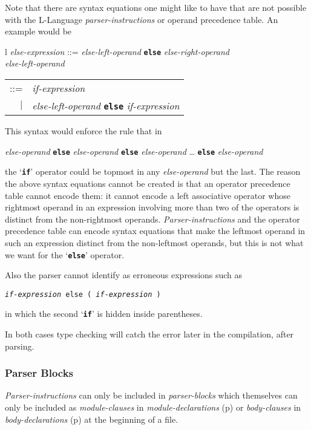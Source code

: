 \documentclass[12pt]{article}
\newcommand{\TT}[1]{{\tt \bfseries #1}}
\newcommand{\pagref}[1]{p\pageref{#1}}
\begin{document}
Note that there are syntax equations one might like to
have that are not possible with the L-Language {\em parser-instructions}
or operand precedence table.  An example would be
\begin{center}
\begin{tabular}{l}
{\em else-expression} ::= {\em else-left-operand} \TT{else}
                          {\em else-right-operand} \\
{\em else-left-operand}
    \begin{tabular}[t]{rl}
    ::= & {\em if-expression} \\
    $|$ & {\em else-left-operand} \TT{else} {\em if-expression}
    \end{tabular}
\end{tabular}
\end{center}
This syntax would enforce the rule that in
\begin{center}
{\em else-operand} \TT{else} {\em else-operand} \TT{else} {\em else-operand}
    \ldots{} \TT{else} {\em else-operand}
\end{center}
the `\TT{if}' operator could be topmost in any {\em else-operand}
but the last.  The reason the above syntax equations cannot be
created is that an operator precedence table cannot encode them:
it cannot encode a left associative operator whose rightmost
operand in an expression involving more than two of the operators
is distinct from the non-rightmost operands.  {\em Parser-instructions}
and the operator precedence table can encode syntax equations that
make the leftmost operand in such an expression distinct from
the non-leftmost operands, but this is not what we want for the
`\TT{else}' operator.

Also the parser cannot identify as erroneous expressions such as
\begin{center}
\tt {\em if-expression} else ( {\em if-expression} )
\end{center}
in which the second `\TT{if}' is hidden inside parentheses.

In both cases type checking will catch the error later in the
compilation, after parsing.



\subsubsection{Parser Blocks}
\label{PARSER-BLOCKS}

{\em Parser-instructions} can only be included in {\em parser-blocks}
which themselves can only be included as {\em module-clauses} in
{\em module-declarations} (\pagref{MODULE-DECLARATION})
or {\em body-clauses} in {\em body-declarations} (\pagref{BODY-DECLARATION})
at the beginning of a file.
\end{document}
